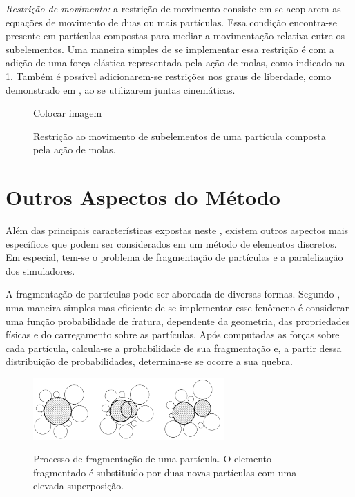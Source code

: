 \begin{alineas}
\item \textit{Restrição de movimento:} a restrição de movimento consiste em se acoplarem as equações de movimento de duas ou mais partículas. Essa condição encontra-se presente em partículas compostas para mediar a movimentação relativa entre os subelementos. Uma maneira simples de se implementar essa restrição é com a adição de uma força elástica representada pela ação de molas, como indicado na \cref{fig:boundary_conditions:restrition}. Também é possível adicionarem-se restrições nos graus de liberdade, como demonstrado em , ao se utilizarem juntas cinemáticas.

\begin{figure}[h]
	\caption{Restrição ao movimento de subelementos de uma partícula composta pela ação de molas.}
	\centering
		\alert{Colocar imagem}
	\label{fig:boundary_conditions:restrition}
\end{figure}
\end{alineas}

\section{Outros Aspectos do Método}

Além das principais características expostas neste , existem outros aspectos mais específicos que podem ser considerados em um método de elementos discretos. Em especial, tem-se o problema de fragmentação de partículas e a paralelização dos simuladores.

A fragmentação de partículas pode ser abordada de diversas formas. Segundo , uma maneira simples mas eficiente de se implementar esse fenômeno é considerar uma função probabilidade de fratura, dependente da geometria, das propriedades físicas e do carregamento sobre as partículas. Após computadas as forças sobre cada partícula, calcula-se a probabilidade de sua fragmentação e, a partir dessa distribuição de probabilidades, determina-se se ocorre a sua quebra.

\begin{figure}[h]
	\caption{Processo de fragmentação de uma partícula. O elemento fragmentado é substituído por duas novas partículas com uma elevada superposição.}
	\centering
		\includegraphics[width=0.65\textwidth]{images/discrete_element_method/fragmentation/particle_fragmentation_process}
	\label{fig:discrete_element_method:fragmentation}
\end{figure}

